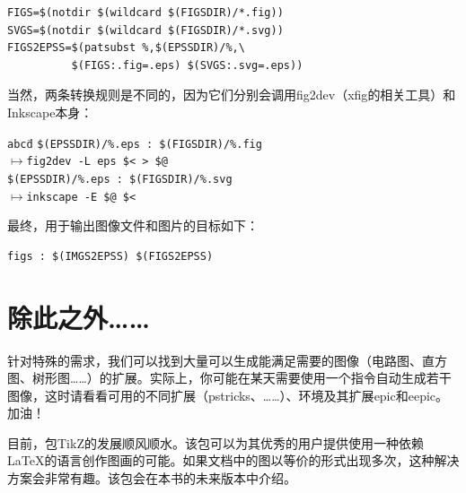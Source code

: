 \begin{mdframed}
\begin{verbatim}
FIGS=$(notdir $(wildcard $(FIGSDIR)/*.fig))
SVGS=$(notdir $(wildcard $(FIGSDIR)/*.svg))
FIGS2EPSS=$(patsubst %,$(EPSSDIR)/%,\
          $(FIGS:.fig=.eps) $(SVGS:.svg=.eps))
\end{verbatim}
\end{mdframed}

当然，两条转换规则是不同的，因为它们分别会调用\textsf{fig2dev}（\textsf{xfig}的相关工具）和\textsf{Inkscape}本身：

\begin{mdframed}
\begin{tabbing}
\verb|abcd|\=\kill
\verb+$(EPSSDIR)/%.eps : $(FIGSDIR)/%.fig+\\
$\longmapsto$\>\verb+fig2dev -L eps $< > $@+\\
\verb+$(EPSSDIR)/%.eps : $(FIGSDIR)/%.svg+\\
$\longmapsto$\>\verb+inkscape -E $@ $<+
\end{tabbing}
\end{mdframed}

最终，用于输出图像文件和图片的目标如下：

\begin{mdframed}
\begin{verbatim}
figs : $(IMGS2EPSS) $(FIGS2EPSS)
\end{verbatim}
\end{mdframed}

\section{除此之外……}

针对特殊的需求，我们可以找到大量可以生成能满足需要的图像（电路图、直方图、树形图……）的扩展。实际上，你可能在某天需要使用一个指令自动生成若干图像，这时请看看可用的不同扩展（\textsf{pstricks}、\MP……）、环境及其扩展\textsf{epic}和\textsf{eepic}。加油！

\begin{ii}
目前，包TikZ的发展顺风顺水。该包可以为其优秀的用户提供使用一种依赖\LaTeX 的语言创作图画的可能。如果文档中的图以等价的形式出现多次，这种解决方案会非常有趣。该包会在本书的未来版本中介绍。
\end{ii}